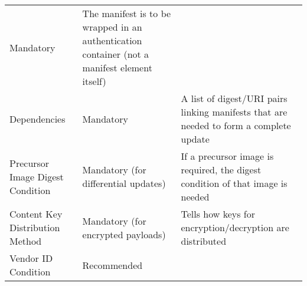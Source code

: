 \documentclass[0-thesis.tex]{subfiles}
\begin{document}
\begin{longtable}[]{@{}lll@{}}
\begin{minipage}[t]{0.26\columnwidth}
    Mandatory\strut
    \end{minipage} & \begin{minipage}[t]{0.60\columnwidth}\raggedright\strut
    The manifest is to be wrapped in an authentication container (not a
    manifest element itself)\strut
    \end{minipage}\tabularnewline
    \begin{minipage}[t]{0.23\columnwidth}\raggedright\strut
    Dependencies\strut
    \end{minipage} & \begin{minipage}[t]{0.26\columnwidth}\raggedright\strut
    Mandatory\strut
    \end{minipage} & \begin{minipage}[t]{0.60\columnwidth}\raggedright\strut
    A list of digest/URI pairs linking manifests that are needed to form a
    complete update\strut
    \end{minipage}\tabularnewline
    \begin{minipage}[t]{0.23\columnwidth}\raggedright\strut
    Precursor Image Digest Condition\strut
    \end{minipage} & \begin{minipage}[t]{0.26\columnwidth}\raggedright\strut
    Mandatory (for differential updates)\strut
    \end{minipage} & \begin{minipage}[t]{0.60\columnwidth}\raggedright\strut
    If a precursor image is required, the digest condition of that image is needed\strut
    \end{minipage}\tabularnewline
    \begin{minipage}[t]{0.23\columnwidth}\raggedright\strut
    Content Key Distribution Method\strut
    \end{minipage} & \begin{minipage}[t]{0.26\columnwidth}\raggedright\strut
    Mandatory (for encrypted payloads)\strut
    \end{minipage} & \begin{minipage}[t]{0.60\columnwidth}\raggedright\strut
    Tells how keys for encryption/decryption are distributed\strut
    \end{minipage}\tabularnewline
    \begin{minipage}[t]{0.23\columnwidth}\raggedright\strut
    Vendor ID Condition\strut
    \end{minipage} & \begin{minipage}[t]{0.26\columnwidth}\raggedright\strut
    Recommended\strut

\end{minipage}
\end{longtable}
\end{document}
